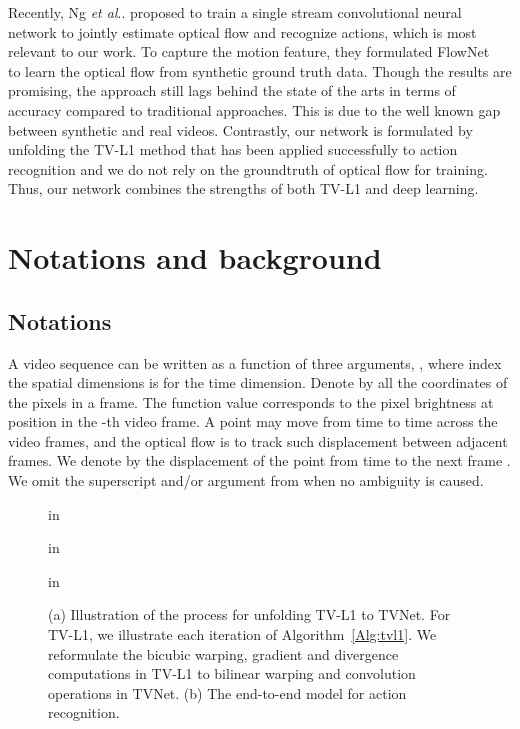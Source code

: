 \documentclass[10pt,twocolumn,letterpaper]{article}
\makeatletter
\DeclareRobustCommand\onedot{\futurelet\@let@token\@onedot}
\def\@onedot{\ifx\@let@token.\else.\null\fi\xspace}
\def\etal{\emph{et al}\onedot}
\makeatother
\begin{document}
Recently, Ng \etal \cite{ng2016actionflownet} proposed to train a single stream convolutional neural network to jointly estimate
optical flow and recognize actions, which is most relevant to our work. To capture the motion feature, they formulated FlowNet~\cite{fischer2015flownet} to learn the optical flow from synthetic
ground truth data. Though the results are promising, the approach still lags behind the state of the arts in terms of accuracy compared to traditional approaches. This is due to the well known gap between synthetic and real videos. Contrastly, our network is formulated by unfolding the TV-L1 method that has been applied successfully to action recognition and we do not rely on the groundtruth of optical flow for training. Thus, our network combines the strengths of both TV-L1 and deep learning.




 \section{Notations and background}


\subsection {Notations}
A video sequence can be written as a function of three arguments, , where  index the spatial dimensions  is for the time dimension. Denote by  all the coordinates of the pixels in a frame. The function value  corresponds to the pixel brightness at position  in the -th video frame. A point  may move from time to time across the video frames, and the optical flow is to track such displacement between adjacent frames. We denote by  the displacement of the point  from time  to the next frame . We omit the superscript  and/or argument  from  when no ambiguity is caused.


\begin{figure*}[!th]
 in
\begin{center}
 in
\caption{(a) Illustration of the process for unfolding TV-L1 to TVNet. For TV-L1, we illustrate each iteration of Algorithm~\ref{Alg:tvl1}. We reformulate the bicubic warping, gradient and divergence computations in TV-L1 to bilinear warping and convolution operations in TVNet. (b) The end-to-end model for action recognition. }
\label{Fig:tvnet}
\end{center}
 in
\end{figure*}
\end{document}
